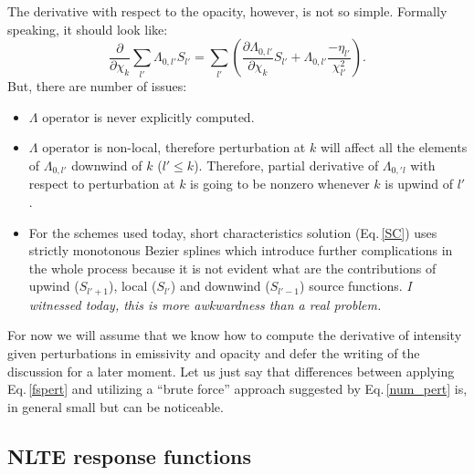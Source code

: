 \documentclass[referee]{aa}
\begin{document}
The derivative with respect to the opacity, however, is not so simple. Formally speaking, it should look like:
\begin{equation}
 \frac{\partial}{\partial \chi_k} \sum_{l'} \Lambda_{0,l'} S_{l'} = \sum_{l'} \left ( \frac{\partial \Lambda_{0,l'}}{\partial \chi_k} S_{l'} + \Lambda_{0,l'} \frac{-\eta_{l'}}{\chi_{l'}^2} \right ).
\end{equation}
But, there are number of issues:
\begin{itemize}
 \item $\Lambda$ operator is never explicitly computed. 
 \item $\Lambda$ operator is non-local, therefore perturbation at $k$ will affect all the elements of $\Lambda_{0,l'}$ downwind of $k$ ($l' \le k$). Therefore, partial derivative of $\Lambda_{0,'l}$ with respect to perturbation at $k$ is going to be nonzero whenever $k$ is upwind of $l'$. 
 \item For the schemes used today, short characteristics solution (Eq.\,\ref{SC}) uses strictly monotonous Bezier splines which introduce further complications in the whole process because it is not evident what are the contributions of upwind ($S_{l'+1}$), local ($S_{l'}$) and downwind ($S_{l'-1}$) source functions. \emph{I witnessed today, this is more awkwardness than a real problem.}
\end{itemize}

For now we will assume that we know how to compute the derivative of intensity given perturbations in emissivity and opacity and defer the writing of the discussion for a later moment. Let us just say that differences between applying Eq.\,\ref{fspert} and utilizing a ``brute force'' approach suggested by Eq.\,\ref{num_pert} is, in general small but can be noticeable. 
 
\subsection{NLTE response functions}
\end{document}
